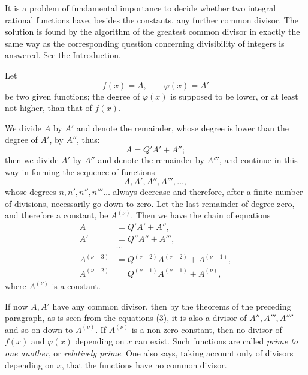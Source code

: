 \documentclass[11pt]{article}
\begin{document}
It is a problem of fundamental importance to decide whether two integral rational functions have, besides the constants, any further common divisor. The solution is found by the algorithm of the greatest common divisor in exactly the same way as the corresponding question concerning divisibility of integers is answered. See the Introduction.

Let
\begin{equation}
 f(x)=A,
 \qquad
 \varphi(x)=A'
\tag{1}
\end{equation}
be two given functions; the degree of $\varphi(x)$ is supposed to be lower, or at least not higher, than that of $f(x)$.

We divide $A$ by $A'$ and denote the remainder, whose degree is lower than the degree of $A'$, by $A''$, thus:
\[
 A=Q'A'+A'';
\]
then we divide $A'$ by $A''$ and denote the remainder by $A'''$, and continue in this way in forming the sequence of functions
\begin{equation}
 A,A',A'',A''',\ldots,
\tag{2}
\end{equation}
whose degrees $n,n',n'',n'''\ldots$ always decrease and therefore, after a finite number of divisions, necessarily go down to zero. Let the last remainder of degree zero, and therefore a constant, be $A^{(\nu)}$. Then we have the chain of equations
\begin{equation}
\begin{aligned}
A&=Q'A'+A'',\\
A'&=Q''A''+A''',\\
&\cdots\\
A^{(\nu-3)}&=Q^{(\nu-2)}A^{(\nu-2)}+A^{(\nu-1)},\\
A^{(\nu-2)}&=Q^{(\nu-1)}A^{(\nu-1)}+A^{(\nu)},
\end{aligned}
\tag{3}
\end{equation}
where $A^{(\nu)}$ is a constant.

If now $A,A'$ have any common divisor, then by the theorems of the preceding paragraph, as is seen from the equations (3), it is also a divisor of $A'',A''',A''''$ and so on down to $A^{(\nu)}$. If $A^{(\nu)}$ is a non-zero constant, then no divisor of $f(x)$ and $\varphi(x)$ depending on $x$ can exist. Such functions are called \emph{prime to one another}, or \emph{relatively prime}. One also says, taking account only of divisors depending on $x$, that the functions have no common divisor.
\end{document}
